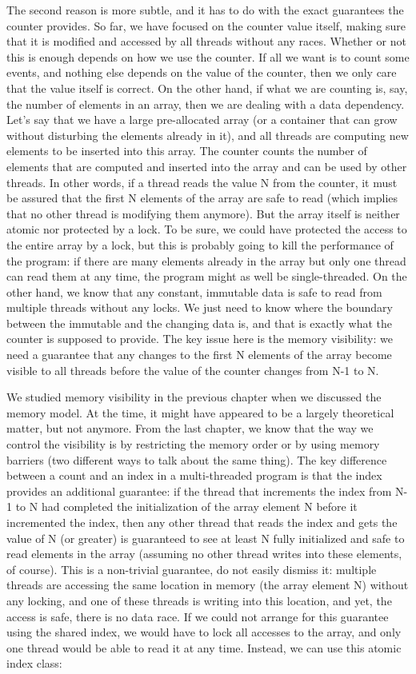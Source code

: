The second reason is more subtle, and it has to do with the exact guarantees the counter provides. So far, we have focused on the counter value itself, making sure that it is modified and accessed by all threads without any races. Whether or not this is enough depends on how we use the counter. If all we want is to count some events, and nothing else depends on the value of the counter, then we only care that the value itself is correct. On the other hand, if what we are counting is, say, the number of elements in an array, then we are dealing with a data dependency. Let's say that we have a large pre-allocated array (or a container that can grow without disturbing the elements already in it), and all threads are computing new elements to be inserted into this array.  The counter counts the number of elements that are computed and inserted into the array and can be used by other threads. In other words, if a thread reads the value N from the counter, it must be assured that the first N elements of the array are safe to read (which implies that no other thread is modifying them anymore). But the array itself is neither atomic nor protected by a lock. To be sure, we could have protected the access to the entire array by a lock, but this is probably going to kill the performance of the program: if there are many elements already in the array but only one thread can read them at any time, the program might as well be single-threaded. On the other hand, we know that any constant, immutable data is safe to read from multiple threads without any locks. We just need to know where the boundary between the immutable and the changing data is, and that is exactly what the counter is supposed to provide. The key issue here is the memory visibility: we need a guarantee that any changes to the first N elements of the array become visible to all threads before the value of the counter changes from N-1 to N.

We studied memory visibility in the previous chapter when we discussed the memory model. At the time, it might  have appeared to be a largely theoretical matter, but not anymore. From the last chapter, we know that the way we control the visibility is by restricting the memory order or by using memory barriers (two different ways to talk about the same thing). The key difference between a count and an index in a multi-threaded program is that the index provides an additional guarantee: if the thread that increments the index from N-1 to N had completed the initialization of the array element N before it incremented the index, then any other thread that reads the index and gets the value of N (or greater) is guaranteed to see at least N fully initialized and safe to read elements in the array (assuming no other thread writes into these elements, of course). This is a non-trivial guarantee, do not easily dismiss it: multiple threads are accessing the same location in memory (the array element N) without any locking, and one of these threads is writing into this location, and yet, the access is safe, there is no data race. If we could not arrange for this guarantee using the shared index, we would have to lock all accesses to the array, and only one thread would be able to read it at any time. Instead, we can use this atomic index class:

